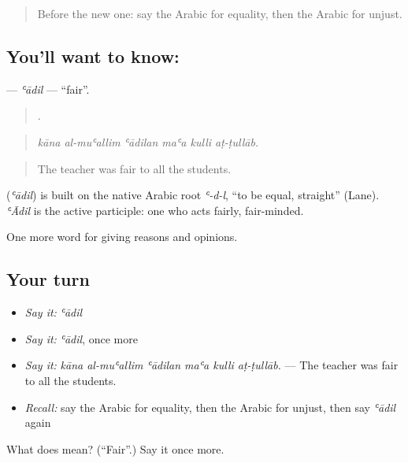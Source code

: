 \begin{quote}
Before the new one: say the Arabic for equality, then the Arabic for unjust.
\end{quote}

\subsection*{You'll want to know: }
\textbf{} — \emph{ʿādil} — \textquotedblleft{}fair\textquotedblright{}.

\begin{quote}
     .
\end{quote}

\begin{quote}
\emph{kāna al-muʿallim ʿādilan maʿa kulli aṭ-ṭullāb.}
\end{quote}

\begin{quote}
The teacher was fair to all the students.
\end{quote}

\begin{cousinweb}
\textbf{} (\emph{ʿādil}) is built on the native Arabic root \emph{ʿ-d-l}, \textquotedblleft{}to be equal, straight\textquotedblright{} (Lane). \emph{ʿĀdil} is the active participle: one who acts fairly, fair-minded.
\end{cousinweb}

\begin{grammarlens}[title={What you've built}]
One more word for giving reasons and opinions.
\end{grammarlens}

\subsection*{Your turn}
\begin{itemize}
\raggedright
  \item \emph{Say it:} \emph{ʿādil}
  \item \emph{Say it:} \emph{ʿādil}, once more
  \item \emph{Say it:} \emph{kāna al-muʿallim ʿādilan maʿa kulli aṭ-ṭullāb.} — The teacher was fair to all the students.
  \item \emph{Recall:} say the Arabic for equality, then the Arabic for unjust, then say \emph{ʿādil} again
\end{itemize}

\begin{tcolorbox}[breakable,colback=teal!4,colframe=teal!35!black,title={Before you move on}]
What does  mean? (\textquotedblleft{}Fair\textquotedblright{}.) Say it once more.
\end{tcolorbox}
